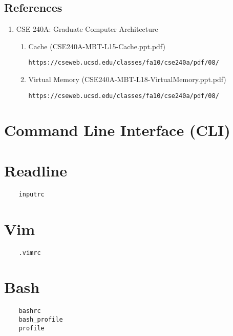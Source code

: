 \documentclass{article}
\begin{document}
\subsection{References}

\begin{enumerate}

\item CSE 240A: Graduate Computer Architecture

	\begin{enumerate}

	\item Cache (CSE240A-MBT-L15-Cache.ppt.pdf)

	\texttt{https://cseweb.ucsd.edu/classes/fa10/cse240a/pdf/08/}

	\item Virtual Memory (CSE240A-MBT-L18-VirtualMemory.ppt.pdf)

	\texttt{https://cseweb.ucsd.edu/classes/fa10/cse240a/pdf/08/}

	\end{enumerate}

\end{enumerate}

\section{Command Line Interface (CLI)}

\section{Readline}

\begin{verbatim}
	inputrc
\end{verbatim}

\section{Vim}

\begin{verbatim}
	.vimrc
\end{verbatim}

\section{Bash}

\begin{verbatim}
	bashrc
	bash_profile
	profile
\end{verbatim}
\end{document}
